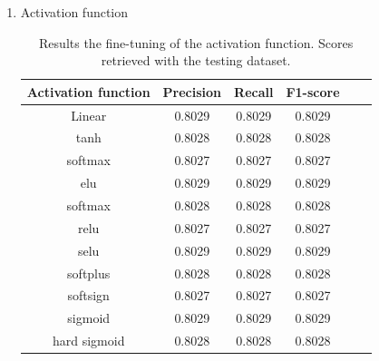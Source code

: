 \begin{enumerate}
    \item Activation function
        \begin{table}[!h]
            \centering
            \begin{tabular}{c|c|c|c|c|c}
            \textbf{Activation function} & \textbf{Precision} & \textbf{Recall} & \textbf{F1-score} \\ \hline
            Linear      &   	0.8029  &   	0.8029  &   	0.8029  \\
            tanh        &   	0.8028  &   	0.8028  &   	0.8028  \\
            softmax     &   	0.8027  &   	0.8027  &   	0.8027  \\
            elu         &   	0.8029  &   	0.8029  &   	0.8029  \\
            softmax     &   	0.8028  &   	0.8028  &   	0.8028  \\
            relu        &   	0.8027  &   	0.8027  &   	0.8027  \\
            selu        &    	0.8029  &   	0.8029  &   	0.8029  \\
            softplus    &   	0.8028  &   	0.8028  &   	0.8028  \\
            softsign    &   	0.8027  &   	0.8027  &   	0.8027  \\
            sigmoid     &   	0.8029  &   	0.8029  &   	0.8029  \\
            hard sigmoid        &   	0.8028  &   	0.8028  &   	0.8028  \\
            \end{tabular}
            \caption{Results the fine-tuning of the activation function. Scores retrieved with the testing dataset.}
        \end{table}
    

\end{enumerate}
